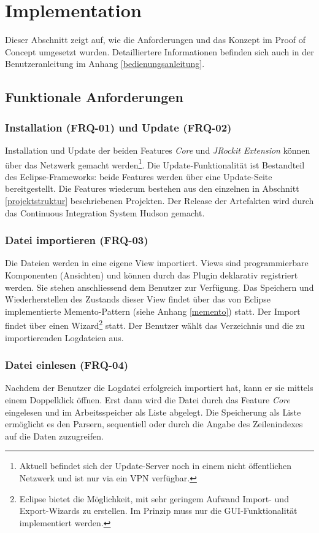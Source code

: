 \chapter{Implementation}\label{implementation}
Dieser Abschnitt zeigt auf, wie die Anforderungen und das Konzept im Proof of Concept umgesetzt wurden. Detailliertere Informationen befinden sich auch in der Benutzeranleitung im Anhang \ref{bedienungsanleitung}.
\section{Funktionale Anforderungen}
\subsection{Installation (FRQ-01) und Update (FRQ-02)}
Installation und Update der beiden Features \textit{Core} und \textit{JRockit Extension} können über das Netzwerk gemacht werden\footnote{Aktuell befindet sich der Update-Server noch in einem nicht öffentlichen Netzwerk und ist nur via ein VPN verfügbar.}. Die Update-Funktionalität ist Bestandteil des Eclipse-Frameworks: beide Features werden über eine Update-Seite bereitgestellt. Die Features wiederum bestehen aus den einzelnen in Abschnitt \ref{projektstruktur} beschriebenen Projekten. Der Release der Artefakten wird durch das Continuous Integration System Hudson gemacht.

\subsection{Datei importieren (FRQ-03)}
Die Dateien werden in eine eigene View importiert. Views sind programmierbare Komponenten (Ansichten) und können durch das Plugin deklarativ registriert werden. Sie stehen anschliessend dem Benutzer zur Verfügung. Das Speichern und Wiederherstellen des Zustands dieser View findet über das von Eclipse implementierte Memento-Pattern (siehe Anhang \ref{memento}) statt. Der Import findet über einen Wizard\footnote{Eclipse bietet die Möglichkeit, mit sehr geringem Aufwand Import- und Export-Wizards zu erstellen. Im Prinzip muss nur die GUI-Funktionalität implementiert werden.} statt. Der Benutzer wählt das Verzeichnis und die zu importierenden Logdateien aus.

\subsection{Datei einlesen (FRQ-04)}
Nachdem der Benutzer die Logdatei erfolgreich importiert hat, kann er sie mittels einem Doppelklick öffnen. Erst dann wird die Datei durch das Feature \textit{Core} eingelesen und im Arbeitsspeicher als Liste abgelegt. Die Speicherung als Liste ermöglicht es den Parsern, sequentiell oder durch die Angabe des Zeilenindexes auf die Daten zuzugreifen.

